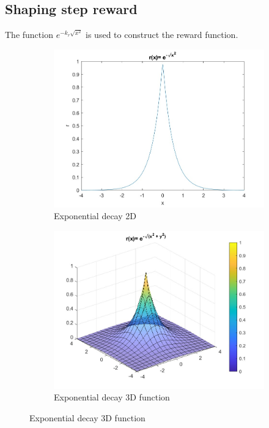 \subsection{Shaping step reward}
The function $e^{-k_r\sqrt{x^2}}$ is used to construct the reward function.

\begin{figure}[h]
        \centering
   \begin{subfigure}[b]{0.45\textwidth}
         \centering
         \includegraphics[width=\textwidth]{figures/Exp.jpg}
         \caption{Exponential decay 2D}
         \label{fig:exp1}
     \end{subfigure}
     \hfill
     \begin{subfigure}[b]{0.45\textwidth}
         \centering
         \includegraphics[width=\textwidth]{figures/Exp2.jpg}
         \caption{Exponential decay 3D function }
         \label{fig:exp2}
     \end{subfigure}
     \hfill
\end{figure}

